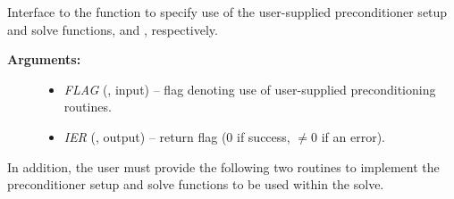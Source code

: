 \documentclass[letterpaper,10pt,english]{sphinxmanual}
\begin{document}
\begin{fulllineitems}
\label{f_interface/Usage:f/_/FARKSPILSSETPREC}
Interface to the function {\hyperref[c_interface/User_callable:ARKSpilsSetPreconditioner]{}} to
specify use of the user-supplied preconditioner setup and solve
functions, {\hyperref[f_interface/Usage:f/_/FARKPSET]{}} and {\hyperref[f_interface/Usage:f/_/FARKPSOL]{}}, respectively.
\begin{description}
\item[{\textbf{Arguments:}}] \leavevmode\begin{itemize}
\item {} 
\emph{FLAG} (, input) -- flag denoting use of user-supplied
preconditioning routines.

\item {} 
\emph{IER}  (, output) -- return flag  (0 if success,
$\ne 0$ if an error).

\end{itemize}

\end{description}

\end{fulllineitems}


In addition, the user must provide the following two routines to
implement the preconditioner setup and solve functions to be used
within the solve.
\end{document}
